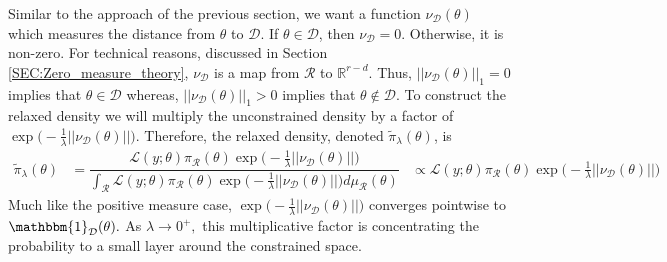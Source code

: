 \documentclass[10pt,fleqn]{article}
\DeclareMathOperator{\1}{\mathbbm{1}}
\begin{document}
Similar to the approach of the previous section, we want a function $\nu_\mathcal{D}(\theta)$ which measures the distance from $\theta$ to $\mathcal{D}.$ If $\theta\in\mathcal{D}$, then $\nu_\mathcal{D}=0$. Otherwise, it is non-zero.  For technical reasons, discussed in Section \ref{SEC:Zero_measure_theory}, $\nu_\mathcal{D}$ is a map from $\mathcal{R}$ to $\mathbb{R}^{r-d}.$ Thus, $||\nu_\mathcal{D}(\theta)||_1 = 0$ implies that $\theta \in \mathcal{D}$ whereas, $||\nu_\mathcal{D}(\theta)||_1 >0$ implies that $\theta\notin\mathcal{D}.$ To construct the relaxed density we will multiply the unconstrained density by a factor of $\exp\bigg(-\frac{1}{\lambda}||\nu_\mathcal{D}(\theta)||\bigg)$. Therefore, the relaxed density, denoted $\tilde{\pi}_\lambda(\theta)$, is 
\begin{equation}
\begin{split}
\tilde{\pi}_\lambda(\theta) &= \dfrac{\mathcal{L}(y;\theta) \pi_\mathcal{R}(\theta)\exp\bigg(-\frac{1}{\lambda}||\nu_\mathcal{D}(\theta)||\bigg)}{\int_\mathcal{R} \mathcal{L}(y;\theta) \pi_\mathcal{R}(\theta)\exp\bigg(-\frac{1}{\lambda}||\nu_\mathcal{D}(\theta)||\bigg) d\mu_\mathcal{R}(\theta) }
& \propto \mathcal{L}(y;\theta) \pi_\mathcal{R}(\theta)\exp\bigg(-\frac{1}{\lambda}||\nu_\mathcal{D}(\theta)||\bigg)
\end{split}
\end{equation}
Much like the positive measure case, $\exp\bigg(-\frac{1}{\lambda}||\nu_\mathcal{D}(\theta)||\bigg)$ converges pointwise to $\mathbbm{1}_\mathcal{D}(\theta).$ As $\lambda\to0^+,$ this multiplicative factor is concentrating the probability to a small layer around the constrained space.
\end{document}
